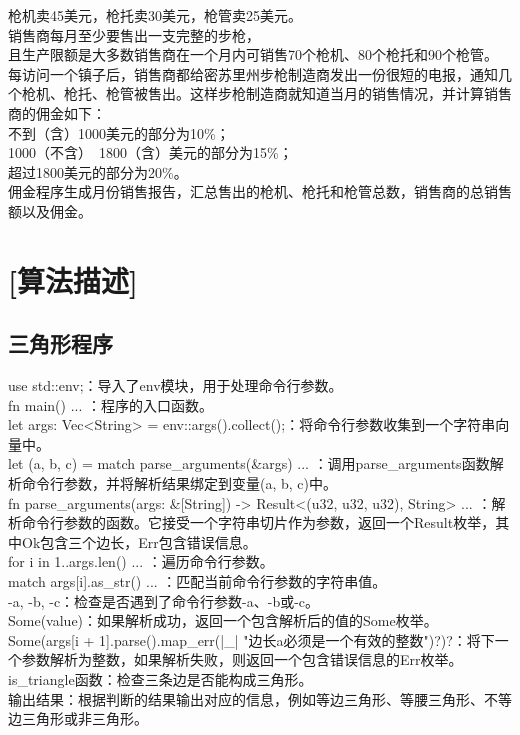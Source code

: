 \documentclass{article}
\begin{document}
枪机卖45美元，枪托卖30美元，枪管卖25美元。\\

销售商每月至少要售出一支完整的步枪，\\

且生产限额是大多数销售商在一个月内可销售70个枪机、80个枪托和90个枪管。\\

每访问一个镇子后，销售商都给密苏里州步枪制造商发出一份很短的电报，通知几个枪机、枪托、枪管被售出。这样步枪制造商就知道当月的销售情况，并计算销售商的佣金如下：\\

不到（含）1000美元的部分为10\%；\\

1000（不含）~1800（含）美元的部分为15\%；\\

超过1800美元的部分为20\%。\\

佣金程序生成月份销售报告，汇总售出的枪机、枪托和枪管总数，销售商的总销售额以及佣金。\\


\section{[算法描述]}
\subsection{三角形程序}
use std::env;：导入了env模块，用于处理命令行参数。\\
fn main() { ... }：程序的入口函数。\\
let args: Vec<String> = env::args().collect();：将命令行参数收集到一个字符串向量中。\\
let (a, b, c) = match parse\_arguments(\&args) { ... }：调用parse\_arguments函数解析命令行参数，并将解析结果绑定到变量(a, b, c)中。\\
fn parse\_arguments(args: \&[String]) -> Result<(u32, u32, u32), String> { ... }：解析命令行参数的函数。它接受一个字符串切片作为参数，返回一个Result枚举，其中Ok包含三个边长，Err包含错误信息。\\
for i in 1..args.len() { ... }：遍历命令行参数。\\
match args[i].as\_str() { ... }：匹配当前命令行参数的字符串值。\\
-a, -b, -c：检查是否遇到了命令行参数-a、-b或-c。\\
Some(value)：如果解析成功，返回一个包含解析后的值的Some枚举。\\
Some(args[i + 1].parse().map\_err(|\_| "边长a必须是一个有效的整数")?)?：将下一个参数解析为整数，如果解析失败，则返回一个包含错误信息的Err枚举。\\
is\_triangle函数：检查三条边是否能构成三角形。\\
输出结果：根据判断的结果输出对应的信息，例如等边三角形、等腰三角形、不等边三角形或非三角形。\\
\end{document}

